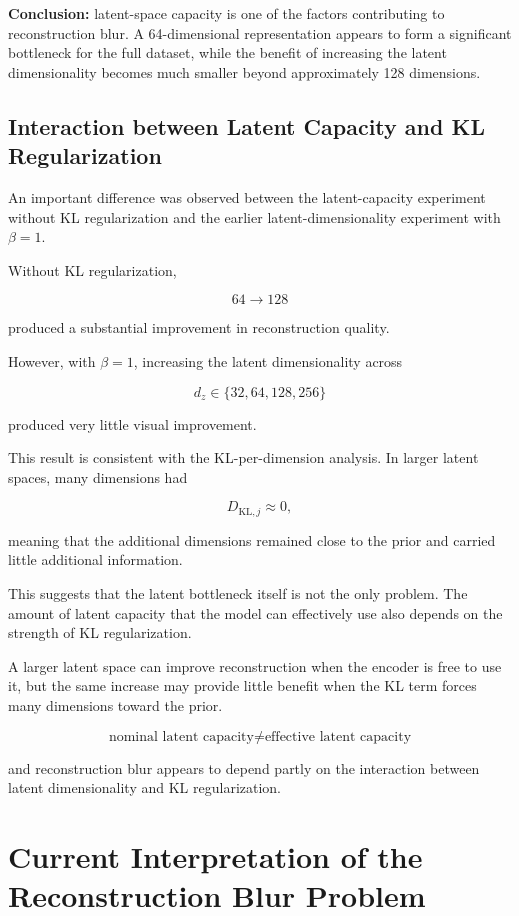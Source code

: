 \documentclass[a4paper,11pt]{article}
\begin{document}
\textbf{Conclusion:} latent-space capacity is one of the factors contributing to reconstruction blur. A 64-dimensional representation appears to form a significant bottleneck for the full dataset, while the benefit of increasing the latent dimensionality becomes much smaller beyond approximately 128 dimensions.


\subsection{Interaction between Latent Capacity and KL Regularization}

An important difference was observed between the latent-capacity experiment without KL regularization and the earlier latent-dimensionality experiment with $\beta=1$.

Without KL regularization,

\[
64 \rightarrow 128
\]

produced a substantial improvement in reconstruction quality.

However, with $\beta=1$, increasing the latent dimensionality across

\[
d_z \in \{32,64,128,256\}
\]

produced very little visual improvement.

This result is consistent with the KL-per-dimension analysis. In larger latent spaces, many dimensions had

\[
D_{\mathrm{KL},j} \approx 0,
\]

meaning that the additional dimensions remained close to the prior and carried little additional information.

This suggests that the latent bottleneck itself is not the only problem. The amount of latent capacity that the model can effectively use also depends on the strength of KL regularization.

A larger latent space can improve reconstruction when the encoder is free to use it, but the same increase may provide little benefit when the KL term forces many dimensions toward the prior.


\[
\boxed{
\text{nominal latent capacity}
\neq
\text{effective latent capacity}
}
\]

and reconstruction blur appears to depend partly on the interaction between latent dimensionality and KL regularization.


\section{Current Interpretation of the Reconstruction Blur Problem}
\end{document}
